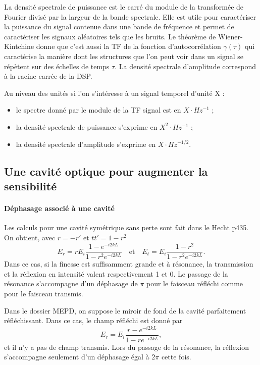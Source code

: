 \documentclass[12pt,a4paper]{article}
\begin{document}
La densité spectrale de puissance est le carré du module de la transformée de Fourier divisé par la largeur de la bande spectrale.
Elle est utile pour caractériser la puissance du signal contenue dans une bande de fréquence et permet de caractériser les signaux aléatoires tels que les bruits.
Le théorème de Wiener-Kintchine donne que c'est aussi la TF de la fonction d'autocorrélation $\gamma(\tau)$ qui caractérise la manière dont les structures que l'on peut voir dans un signal se répètent sur des échelles de temps $\tau$.
La densité spectrale d'amplitude correspond à la racine carrée de la DSP.

Au niveau des unités si l'on s'intéresse à un signal temporel d'unité X :
\begin{itemize}
\item le spectre donné par le module de la TF signal est en $\unit{}{X\cdot Hz^{-1}}$ ;
\item la densité spectrale de puissance s'exprime en $\unit{}{X^2\cdot Hz^{-1}}$ ;
\item la densité spectrale d'amplitude s'exprime en $\unit{}{X\cdot Hz^{-1/2}}$.
\end{itemize}


\subsection{Une cavité optique pour augmenter la sensibilité}
\label{sec:cavity}

\paragraph{Déphasage associé à une cavité\\}
Les calculs pour une cavité symétrique sans perte sont fait dans le Hecht p435.
On obtient, avec $r=-r'$ et $tt'=1-r^2$
\begin{equation}
E_r = rE_i \frac{1-e^{-i2kL}}{1-r^2e^{-i2kL}} \quad \mathrm{et} \quad
E_t = E_i \frac{1-r^2}{1-r^2e^{-i2kL}}.
\end{equation}
Dans ce cas, si la finesse est suffisamment grande et à résonance, la transmission et la réflexion en intensité valent respectivement 1 et 0.
Le passage de la résonance s'accompagne d'un déphasage de $\pi$ pour le faisceau réfléchi comme pour le faisceau transmis.

Dans le dossier MEPD, on suppose le miroir de fond de la cavité parfaitement réfléchissant.
Dans ce cas, le champ réfléchi est donné par 
\begin{equation}
E_r = E_i \frac{r-e^{-i2kL}}{1-re^{-i2kL}},
\end{equation}
et il n'y a pas de champ transmis.
Lors du passage de la résonance, la réflexion s'accompagne seulement d'un déphasage égal à $2\pi$ cette fois.
\end{document}
